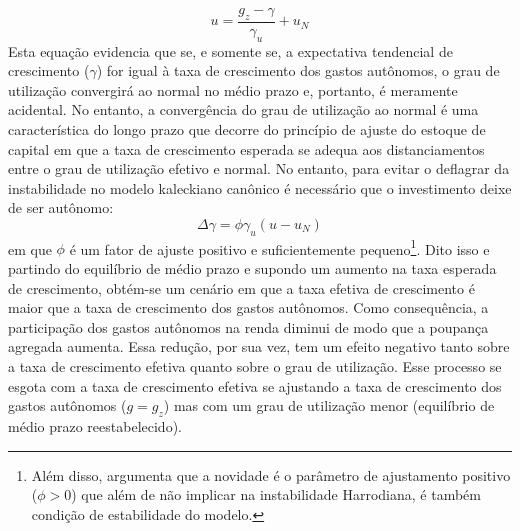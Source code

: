\begin{equation}
u = \frac{g_z - \gamma}{\gamma_u} + u_N
\end{equation}
Esta equação evidencia que se, e somente se, a expectativa tendencial de crescimento ($\gamma$) for igual à taxa de crescimento dos gastos autônomos, o grau de utilização convergirá ao normal no médio prazo e, portanto, é meramente acidental. No entanto, a convergência do grau de utilização ao normal é uma característica do longo prazo que decorre do princípio de ajuste do estoque de capital em que a taxa de crescimento esperada se adequa aos distanciamentos entre o grau de utilização efetivo e normal. No entanto, para evitar o deflagrar da instabilidade no modelo kaleckiano canônico é necessário que o investimento deixe de ser autônomo: 
\begin{equation}
\label{eqAllain}
\Delta \gamma = \phi\gamma_u(u - u_N)
\end{equation}
em que $\phi$ é um fator de ajuste positivo e suficientemente pequeno\footnote{
	Além disso, \textcite[p.~14]{allain_tackling_2015} argumenta que a novidade  é o parâmetro  de ajustamento positivo ($\phi > 0$) que além de não implicar na instabilidade Harrodiana, é também condição de estabilidade do modelo.
}.
Dito isso e partindo do equilíbrio de médio prazo e supondo um aumento na taxa esperada de crescimento, obtém-se um cenário em que a taxa efetiva de crescimento é maior que a taxa de crescimento dos gastos autônomos. Como consequência, a participação dos gastos autônomos na renda diminui de modo que  a poupança agregada aumenta. Essa redução, por sua vez, tem um efeito negativo tanto sobre a taxa de crescimento efetiva quanto sobre o grau de utilização. Esse processo se esgota com a taxa de crescimento efetiva se ajustando a taxa de crescimento dos gastos autônomos ($g = g_z$) mas com um grau de utilização menor  (equilíbrio de médio prazo reestabelecido). 

